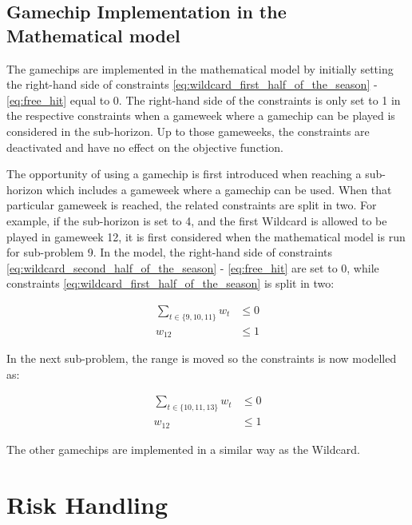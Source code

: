 \subsection{Gamechip Implementation in the Mathematical model}

The gamechips are implemented in the mathematical model by initially setting the right-hand side of constraints \ref{eq:wildcard_first_half_of_the_season} - \ref{eq:free_hit} equal to 0. The right-hand side of the constraints is only set to 1 in the respective constraints when a gameweek where a gamechip can be played is considered in the sub-horizon. Up to those gameweeks, the constraints are deactivated and have no effect on the objective function.

\newpar

The opportunity of using a gamechip is first introduced when reaching a sub-horizon which includes a gameweek where a gamechip can be used. When that particular gameweek is reached, the related constraints are split in two. For example, if the sub-horizon is set to 4, and the first Wildcard is allowed to be played in gameweek 12, it is first considered when the mathematical model is run for sub-problem 9. In the model, the right-hand side of constraints \ref{eq:wildcard_second_half_of_the_season} - \ref{eq:free_hit} are set to 0, while constraints \ref{eq:wildcard_first_half_of_the_season} is split in two: 

\begin{equation*}
    \begin{aligned}
      \sum_{t \in \{9,10,11 \}} w_{t} & \leq 0 \\
         w_{12} & \leq 1
    \end{aligned}
\end{equation*}

In the next sub-problem, the range is moved so the constraints is now modelled as: 

\begin{equation*}
    \begin{aligned}
      \sum_{t \in \{10,11,13\}} w_{t} & \leq 0 \\
         w_{12} & \leq 1
    \end{aligned}
\end{equation*}

The other gamechips are implemented in a similar way as the Wildcard. 



\section{Risk Handling} \label{Ch.5_Variance_tradeoff}


